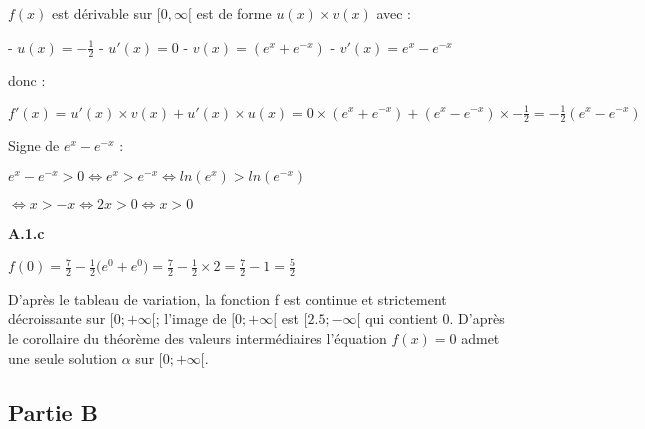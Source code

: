 \documentclass{article}
\begin{document}
\noindent $f(x)$ est dérivable sur $[0, \infty[$ est de forme $u(x) \times v(x)$ avec :

- $u(x) = -\displaystyle\frac{1}{2}$
- $u'(x) = 0$
- $v(x) = (e^{x}+e^{-x})$
- $v'(x) = e^x-e^{-x}$

\noindent donc :

$f'(x) = u'(x) \times v(x) + u'(x) \times u(x) = 0 \times (e^x+e^{-x}) + (e^x-e^{-x}) \times -\displaystyle\frac{1}{2} = -\displaystyle\frac{1}{2}(e^x-e^{-x})$

\vspace{2mm}

\noindent Signe de $e^x-e^{-x}$ :

$e^x - e^{-x} > 0 \Leftrightarrow e^x > e^{-x} \Leftrightarrow ln(e^x) > ln(e^{-x})$

$\Leftrightarrow x > -x \Leftrightarrow 2x > 0 \Leftrightarrow x > 0$

\vspace{3mm}

{\centering
{}
\par}


\vspace{2mm}

\textbf{A.1.c}

\vspace{2mm}

\noindent $f(0) = \displaystyle\frac{7}{2} - \displaystyle\frac{1}{2}\Big(e^0 + e^{0}\Big) = \displaystyle\frac{7}{2} - \displaystyle\frac{1}{2}\times 2 = \displaystyle\frac{7}{2} - 1 = \displaystyle\frac{5}{2}$

\vspace{2mm}

\noindent D'après le tableau de variation, la fonction f est continue et strictement décroissante sur $[0; +\infty[$; l'image de $[0; +\infty[$ est $[2.5; -\infty[$ qui contient 0. D'après le corollaire du théorème des valeurs intermédiaires l'équation $f(x) = 0$ admet une seule solution $\alpha$ sur $[0; +\infty[$.

\vspace{2mm}

\subsection*{Partie B}
\end{document}
